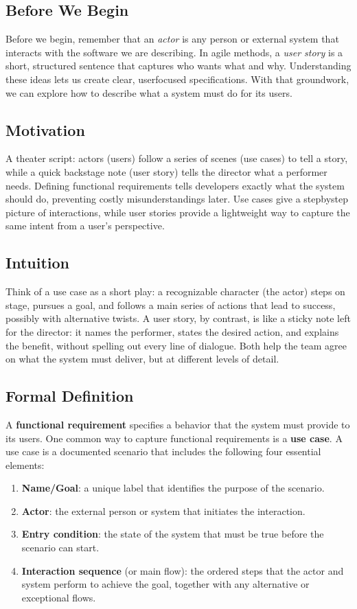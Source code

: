 \documentclass[12pt, a4paper]{article}
\begin{document}
\subsection{Before We Begin}
Before we begin, remember that an \emph{actor} is any person or external system that interacts with the software we are describing. In agile methods, a \emph{user story} is a short, structured sentence that captures who wants what and why. Understanding these ideas lets us create clear, userfocused specifications. With that groundwork, we can explore how to describe what a system must do for its users.

\subsection{Motivation}
A theater script: actors (users) follow a series of scenes (use cases) to tell a story, while a quick backstage note (user story) tells the director what a performer needs. Defining functional requirements tells developers exactly what the system should do, preventing costly misunderstandings later. Use cases give a stepbystep picture of interactions, while user stories provide a lightweight way to capture the same intent from a user's perspective.

\subsection{Intuition}
Think of a use case as a short play: a recognizable character (the actor) steps on stage, pursues a goal, and follows a main series of actions that lead to success, possibly with alternative twists. A user story, by contrast, is like a sticky note left for the director: it names the performer, states the desired action, and explains the benefit, without spelling out every line of dialogue. Both help the team agree on what the system must deliver, but at different levels of detail.

\subsection{Formal Definition}
A \textbf{functional requirement} specifies a behavior that the system must provide to its users. One common way to capture functional requirements is a \textbf{use case}. A use case is a documented scenario that includes the following four essential elements:

\begin{enumerate}
  \item \textbf{Name/Goal}: a unique label that identifies the purpose of the scenario.
  \item \textbf{Actor}: the external person or system that initiates the interaction.
  \item \textbf{Entry condition}: the state of the system that must be true before the scenario can start.
  \item \textbf{Interaction sequence} (or main flow): the ordered steps that the actor and system perform to achieve the goal, together with any alternative or exceptional flows.
\end{enumerate}
\end{document}
